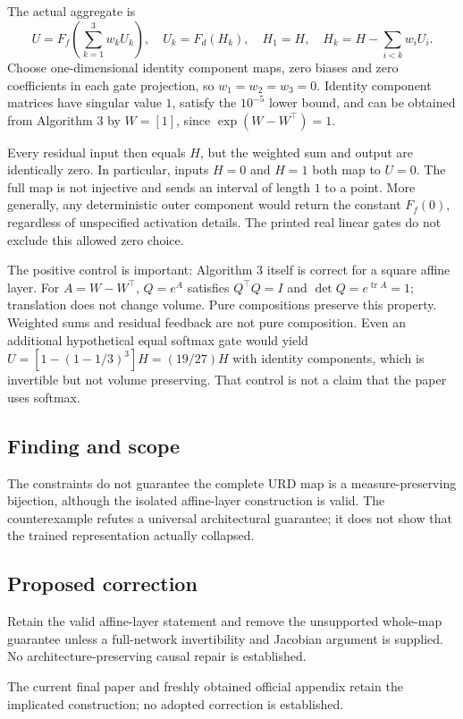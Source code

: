 \documentclass[11pt]{article}
\begin{document}
The actual aggregate is \[U=F_f\!\left(\sum_{k=1}^{3}w_kU_k\right),\quad U_k=F_d(H_k),\quad H_1=H,\quad H_k=H-\sum_{i<k}w_iU_i.\] Choose one-dimensional identity component maps, zero biases and zero coefficients in each gate projection, so \(w_1=w_2=w_3=0\). Identity component matrices have singular value \(1\), satisfy the \(10^{-5}\) lower bound, and can be obtained from Algorithm 3 by \(W=[1]\), since \(\exp(W-W^\top)=1\).

Every residual input then equals \(H\), but the weighted sum and output are identically zero. In particular, inputs \(H=0\) and \(H=1\) both map to \(U=0\). The full map is not injective and sends an interval of length \(1\) to a point. More generally, any deterministic outer component would return the constant \(F_f(0)\), regardless of unspecified activation details. The printed real linear gates do not exclude this allowed zero choice.

The positive control is important: Algorithm 3 itself is correct for a square affine layer. For \(A=W-W^\top\), \(Q=e^A\) satisfies \(Q^\top Q=I\) and \(\det Q=e^{\operatorname{tr}A}=1\); translation does not change volume. Pure compositions preserve this property. Weighted sums and residual feedback are not pure composition. Even an additional hypothetical equal softmax gate would yield \(U=[1-(1-1/3)^3]H=(19/27)H\) with identity components, which is invertible but not volume preserving. That control is not a claim that the paper uses softmax.

\subsection*{Finding and scope}

The constraints do not guarantee the complete URD map is a measure-preserving bijection, although the isolated affine-layer construction is valid. The counterexample refutes a universal architectural guarantee; it does not show that the trained representation actually collapsed.

\subsection*{Proposed correction}

Retain the valid affine-layer statement and remove the unsupported whole-map guarantee unless a full-network invertibility and Jacobian argument is supplied. No architecture-preserving causal repair is established.

The current final paper and freshly obtained official appendix retain the implicated construction; no adopted correction is established.
\end{document}
